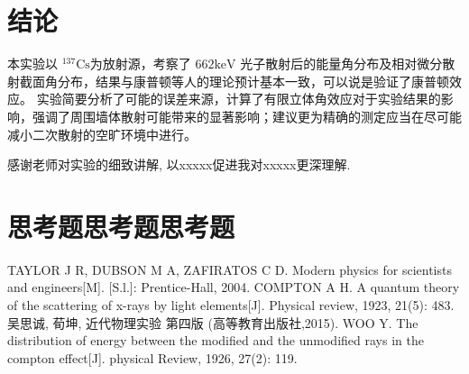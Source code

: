 \documentclass[reprint,  amsmath,  amssymb,  pra,  nofootinbib,  a4paper]{revtex4-2}
\newcommand{\csAtom}{${}^{137}\text{Cs}$}
\begin{document}


\maketitle


\section{结论}
本实验以 \csAtom 为放射源，考察了 ${662}\text{keV}$ 光子散射后的能量角分布及相对微分散射截面角分布，结果与康普顿等人的理论预计基本一致，可以说是验证了康普顿效应。	实验简要分析了可能的误差来源，计算了有限立体角效应对于实验结果的影响，强调了周围墙体散射可能带来的显著影响；建议更为精确的测定应当在尽可能减小二次散射的空旷环境中进行。
\begin{acknowledgments}
感谢老师对实验的细致讲解, 以xxxxx促进我对xxxxx更深理解.

\end{acknowledgments}
\appendix
\section{思考题思考题思考题}

\begin{thebibliography}{99}
     TAYLOR J R, DUBSON M A, ZAFIRATOS C D. Modern physics for scientists and engineers[M]. [S.l.]: Prentice-Hall, 2004.
     COMPTON A H. A quantum theory of the scattering of x-rays by light elements[J]. Physical review, 1923, 21(5): 483.
    吴思诚, 荀坤, 近代物理实验 第四版 (高等教育出版社,2015).
     WOO Y. The distribution of energy between the modified and the unmodified rays in the compton effect[J]. physical Review, 1926, 27(2): 119.
    \end{thebibliography}
\end{document}
